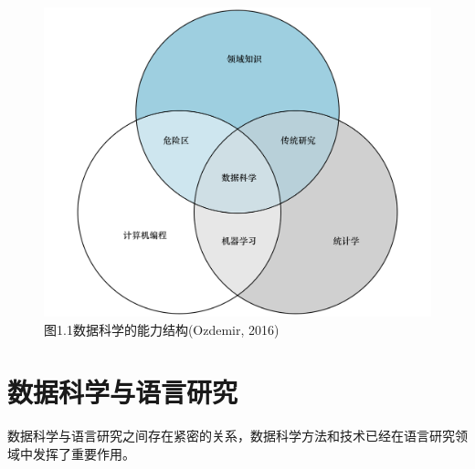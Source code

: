 \documentclass[]{book}
\begin{document}
\begin{figure}
\centering
\includegraphics{images/figure1_1.png}
\caption{图1.1数据科学的能力结构(Ozdemir, 2016)}
\end{figure}

\hypertarget{ux6570ux636eux79d1ux5b66ux4e0eux8bedux8a00ux7814ux7a76}{%
\section{数据科学与语言研究}\label{ux6570ux636eux79d1ux5b66ux4e0eux8bedux8a00ux7814ux7a76}}

数据科学与语言研究之间存在紧密的关系，数据科学方法和技术已经在语言研究领域中发挥了重要作用。
\end{document}
